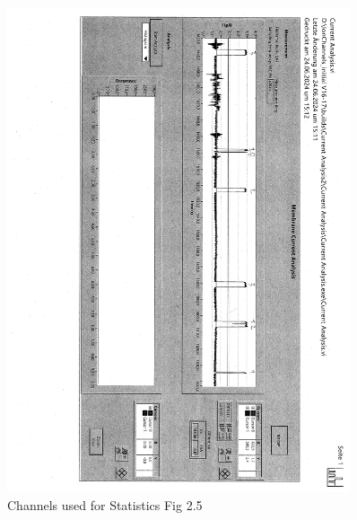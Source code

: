 \documentclass[a4paper,english,12pt,bibliography=totoc]{scrreprt}
\begin{document}
\begin{figure}[H]
    \centering
    \includegraphics[angle=90,width = 0.9\textwidth]{Analysis/ilovepdf_pages-to-jpg/doc00131020240719122038-1_page-0004.jpg}
    \caption{Channels used for Statistics Fig 2.5 }
    \label{fig:enter-label}
\end{figure}
\end{document}
